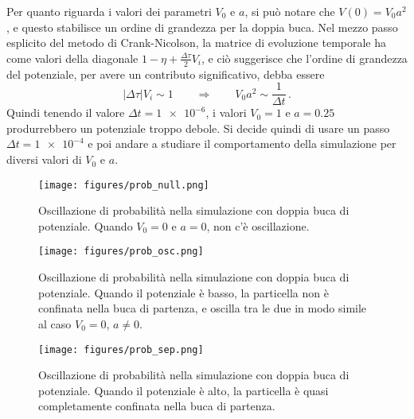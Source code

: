 \documentclass[a4paper, titlepage]{article}
\numberwithin{equation}{section}
\begin{document}
Per quanto riguarda i valori dei parametri $V_0$ e $a$, si può notare che $V(0) = V_0 a^2$, e questo stabilisce un ordine di grandezza per la doppia buca. Nel mezzo passo esplicito del metodo di Crank-Nicolson, la matrice di evoluzione temporale ha come valori della diagonale $1-\eta + \frac{\Delta\tau}{2} V_i$, e ciò suggerisce che l'ordine di grandezza del potenziale, per avere un contributo significativo, debba essere
\begin{equation}
    |\Delta\tau| V_i \sim 1 
    \qquad \Rightarrow \qquad
    V_0 a^2 \sim \frac{1}{\Delta t}\, .
    \label{eq:extim}
\end{equation}
Quindi tenendo il valore $\Delta t = \num{1e-6}$, i valori $V_0 = 1$ e $a = 0.25$ produrrebbero un potenziale troppo debole. Si decide quindi di usare un passo $\Delta t = \num{1e-4}$ e poi andare a studiare il comportamento della simulazione per diversi valori di $V_0$ e $a$.
\begin{figure}[h!]
    \centering
    \begin{minipage}[t]{0.47 \textwidth}
        \centering
        \texttt{[image: figures/prob\_null.png]}
        \caption{Oscillazione di probabilità nella simulazione con doppia buca di potenziale. Quando $V_0 = 0$ e $a = 0$, non c'è oscillazione.}
        \label{fig:prob_null}
    \end{minipage}
    \hspace{0.02\textwidth}
    \begin{minipage}[t]{0.47 \textwidth}
        \centering
        \texttt{[image: figures/prob\_osc.png]}
        \caption{Oscillazione di probabilità nella simulazione con doppia buca di potenziale. Quando il potenziale è basso, la particella non è confinata nella buca di partenza, e oscilla tra le due in modo simile al caso $V_0 = 0$, $a \neq 0$.}
        \label{fig:prob_osc}
    \end{minipage}
\end{figure}
\vspace{-0.5cm}
\begin{figure}[h!]
    \centering
    \begin{minipage}{0.47 \textwidth}
        \centering
        \texttt{[image: figures/prob\_sep.png]}
        \caption{Oscillazione di probabilità nella simulazione con doppia buca di potenziale. Quando il potenziale è alto, la particella è quasi completamente confinata nella buca di partenza.}
        \label{fig:prob_sep}
    \end{minipage}
    \hspace{0.02\textwidth}
    \begin{minipage}{0.47 \textwidth}
        \hspace{\linewidth}
    \end{minipage}
\end{figure}
\end{document}
